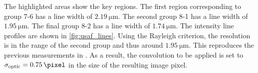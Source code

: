The highlighted areas show the key regions.
The first region corresponding to group \textrm{7-6} \raisebox{.25em}{\tikz \draw[magenta,ultra thick,dashed](0,0)--(0.25,0);} has a line width of $\SI{2.19}{\micro\meter}$.
The second group \textrm{8-1} \raisebox{.25em}{\tikz \draw[yellow,ultra thick,dashed](0,0)--(0.25,0);} has a line width of $\SI{1.95}{\micro\meter}$.
The final group \textrm{8-2} \raisebox{.25em}{\tikz \draw[cyan,ultra thick,dashed](0,0)--(0.25,0);} has a line width of $\SI{1.74}{\micro\meter}$.
The intensity line profiles are shown in \cref{fig:usaf_lines}.
% 
Using the Rayleigh criterion, the resolution is in the range of the second group and thus around $\SI{1.95}{\micro\meter}$.
This reproduces the previous measurements in \cite{menzel_finite-difference_2018} .
As a result, the convolution to be applied is set to $\opticsigma = \SI{0.75}{\pixel}$ in the size of the resulting image pixel.
% 
% 
% 

